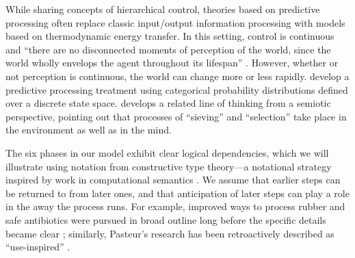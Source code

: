 While sharing concepts of hierarchical control, theories based on
predictive processing often replace classic input/output information
processing with models based on thermodynamic energy transfer.  In
this setting, control is continuous and ``there are no disconnected
moments of perception of the world, since the world wholly envelops
the agent throughout its lifespan''
\cite[pp.~9--10]{10.3389/frobt.2018.00021}.  However, whether or not
perception is continuous, the world can change more or less rapidly.
\citet{KWISTHOUT201784} develop a predictive processing treatment
using categorical probability distributions defined over a discrete
state space.  \citet{kockelman2011biosemiosis} develops a related line
of thinking from a semiotic perspective, pointing out that processes
of ``sieving'' and ``selection'' take place in the environment as well
as in the mind.


The six phases in our model exhibit clear logical dependencies, which
we will illustrate using notation from constructive type theory---a
notational strategy inspired by work in computational semantics
\cite{Piwek2007,krahmer1999presupposition,piwek2000presuppositions}.
We assume that earlier steps can be returned to from later ones, and
that anticipation of later steps can play a role in the away the
process runs.  For example, improved ways to process rubber and safe
antibiotics were pursued in broad outline long before the specific
details became clear \cite{fleming,goodyear1855gum}; similarly,
Pasteur's research has been retroactively described as
``use-inspired'' \cite{stokes1997pasteur}.



